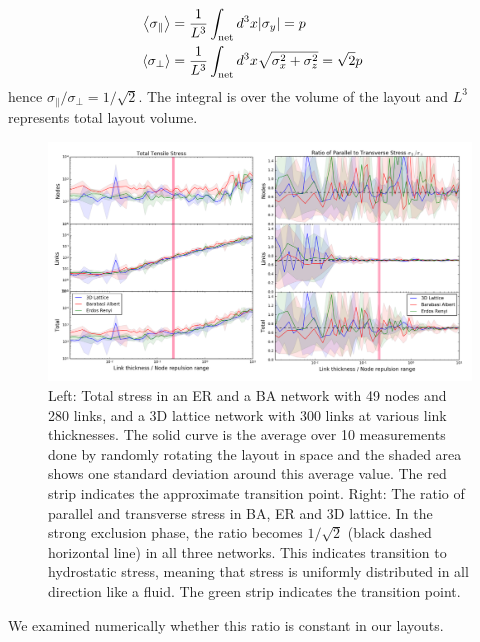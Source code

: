 \documentclass[nofootinbib,preprint,floatfix,endfloats]{revtex4} %
\begin{document}
\begin{align}
\left<\sigma_\parallel\right> &={1\over L^3} \int_\mathrm{net} d^3x |\sigma_y| = p\cr
\left<\sigma_\perp\right> &= {1\over L^3} \int_\mathrm{net} d^3x \sqrt{\sigma_x^2+ \sigma_z^2} = \sqrt{2} p \label{eq:sigp}   
\end{align}
hence $ \sigma_\parallel/\sigma_\perp = 1/\sqrt{2}$. The integral is over the volume of the layout and $L^3$ represents total layout volume. 
\begin{figure}
    \centering
    \includegraphics[width=1\columnwidth]{fig-09-19/stress3.png}
    \caption{Left: Total stress in an ER and a BA network with 49 nodes and 280 links, and a 3D lattice network with 300 links at various link thicknesses. 
    The solid curve is the average over 10 measurements done by randomly rotating the layout in space and the  shaded area shows one standard deviation around this average value. 
    The red strip indicates the approximate transition point. %
    Right: The ratio of parallel and transverse stress in BA, ER and 3D lattice. In the strong exclusion phase, the ratio becomes $1/\sqrt{2}$ (black dashed horizontal line) in  all three networks. 
    This indicates transition to hydrostatic stress, meaning that stress is uniformly distributed in all direction like a fluid. 
    The green strip indicates the transition point.}
    \label{fig:stress2}
\end{figure}
We examined numerically whether this ratio is constant in our layouts.
\end{document}
